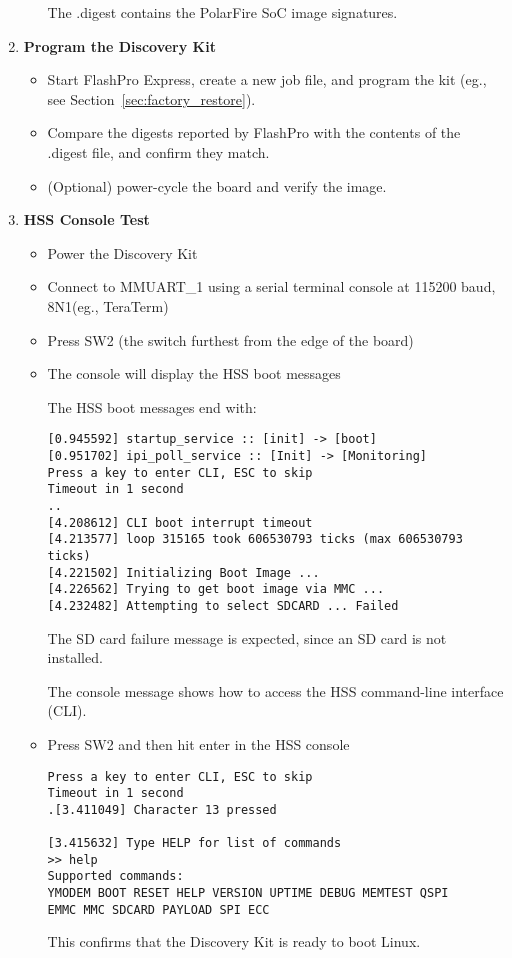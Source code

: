 \begin{enumerate}
\begin{itemize}
The .digest contains the PolarFire SoC image signatures.
\end{itemize}

\item \textbf{Program the Discovery Kit}
%
\begin{itemize}
\item Start FlashPro Express, create a new job file, and program the kit (eg., see Section~\ref{sec:factory_restore}).
\item Compare the digests reported by FlashPro with the contents of the .digest file, and confirm they match.
\item (Optional) power-cycle the board and verify the image.
\end{itemize}

\newpage
\item \textbf{HSS Console Test}
%
\begin{itemize}
\item Power the Discovery Kit
\item Connect to MMUART\_1 using a serial terminal console at 115200 baud, 8N1\newline (eg., TeraTerm)
\item Press SW2 (the switch furthest from the edge of the board)
\item The console will display the HSS boot messages

The HSS boot messages end with:
%
\begin{verbatim}
[0.945592] startup_service :: [init] -> [boot]
[0.951702] ipi_poll_service :: [Init] -> [Monitoring]
Press a key to enter CLI, ESC to skip
Timeout in 1 second
..
[4.208612] CLI boot interrupt timeout
[4.213577] loop 315165 took 606530793 ticks (max 606530793 ticks)
[4.221502] Initializing Boot Image ...
[4.226562] Trying to get boot image via MMC ...
[4.232482] Attempting to select SDCARD ... Failed
\end{verbatim}
%
The SD card failure message is expected, since an SD card is not installed.

The console message shows how to access the HSS command-line interface (CLI).

\item Press SW2 and then hit enter in the HSS console

\begin{verbatim}
Press a key to enter CLI, ESC to skip
Timeout in 1 second
.[3.411049] Character 13 pressed

[3.415632] Type HELP for list of commands
>> help
Supported commands:
YMODEM BOOT RESET HELP VERSION UPTIME DEBUG MEMTEST QSPI
EMMC MMC SDCARD PAYLOAD SPI ECC
\end{verbatim}
%
This confirms that the Discovery Kit is ready to boot Linux.
\end{itemize}
\end{enumerate}

